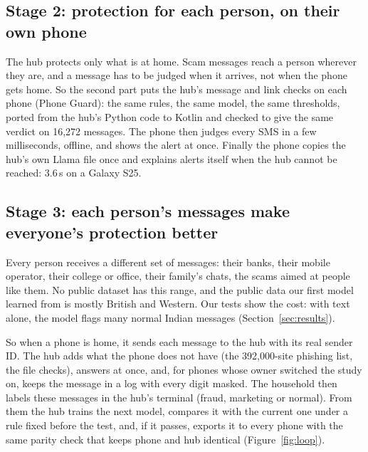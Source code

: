 \documentclass[11pt,a4paper]{article}
\begin{document}
\subsection{Stage 2: protection for each person, on their own phone}

The hub protects only what is at home. Scam messages reach a person wherever they are, and a message has to be
judged when it arrives, not when the phone gets home. So the second part puts the hub's message and link
checks on each phone (Phone Guard): the same rules, the same model, the same thresholds, ported from the hub's
Python code to Kotlin and checked to give the same verdict on 16,272 messages. The phone then judges every SMS
in a few milliseconds, offline, and shows the alert at once. Finally the phone copies the hub's own Llama
file once and explains alerts itself when the hub cannot be reached: 3.6\,s on a Galaxy S25.

\subsection{Stage 3: each person's messages make everyone's protection better}

Every person receives a different set of messages: their banks, their mobile operator, their college or office,
their family's chats, the scams aimed at people like them. No public dataset has this range, and the public
data our first model learned from is mostly British and Western. Our tests show the cost: with text alone, the
model flags many normal Indian messages (Section~\ref{sec:results}).

So when a phone is home, it sends each message to the hub with its real sender ID. The hub adds what the phone
does not have (the 392,000-site phishing list, the file checks), answers at once, and, for phones whose owner
switched the study on, keeps the message in a log with every digit masked. The household then labels these
messages in the hub's terminal (fraud, marketing or normal). From them the hub trains the next model, compares
it with the current one under a rule fixed before the test, and, if it passes, exports it to every phone with
the same parity check that keeps phone and hub identical (Figure~\ref{fig:loop}).
\end{document}

